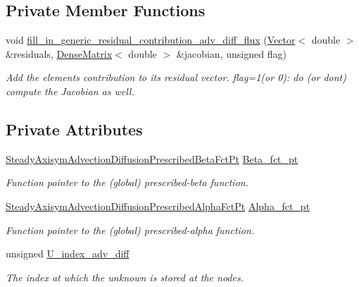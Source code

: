 \subsection*{Private Member Functions}
\begin{DoxyCompactItemize}
\item 
void \hyperlink{classoomph_1_1SteadyAxisymAdvectionDiffusionFluxElement_ab9bb9d085a2f05045a0c78cc7210a25f}{fill\+\_\+in\+\_\+generic\+\_\+residual\+\_\+contribution\+\_\+adv\+\_\+diff\+\_\+flux} (\hyperlink{classoomph_1_1Vector}{Vector}$<$ double $>$ \&residuals, \hyperlink{classoomph_1_1DenseMatrix}{Dense\+Matrix}$<$ double $>$ \&jacobian, unsigned flag)
\begin{DoxyCompactList}\small\item\em Add the element\textquotesingle{}s contribution to its residual vector. flag=1(or 0)\+: do (or don\textquotesingle{}t) compute the Jacobian as well. \end{DoxyCompactList}\end{DoxyCompactItemize}
\subsection*{Private Attributes}
\begin{DoxyCompactItemize}
\item 
\hyperlink{classoomph_1_1SteadyAxisymAdvectionDiffusionFluxElement_acaec4345326b85f4689043efd2cd1e1c}{Steady\+Axisym\+Advection\+Diffusion\+Prescribed\+Beta\+Fct\+Pt} \hyperlink{classoomph_1_1SteadyAxisymAdvectionDiffusionFluxElement_abdcfdeebbd0696dcc41089f644cc2ffa}{Beta\+\_\+fct\+\_\+pt}
\begin{DoxyCompactList}\small\item\em Function pointer to the (global) prescribed-\/beta function. \end{DoxyCompactList}\item 
\hyperlink{classoomph_1_1SteadyAxisymAdvectionDiffusionFluxElement_a28cea997740e6174b3e3583d704229ce}{Steady\+Axisym\+Advection\+Diffusion\+Prescribed\+Alpha\+Fct\+Pt} \hyperlink{classoomph_1_1SteadyAxisymAdvectionDiffusionFluxElement_a6ecd9c041f8fcecc01dd59c4857d4d5b}{Alpha\+\_\+fct\+\_\+pt}
\begin{DoxyCompactList}\small\item\em Function pointer to the (global) prescribed-\/alpha function. \end{DoxyCompactList}\item 
unsigned \hyperlink{classoomph_1_1SteadyAxisymAdvectionDiffusionFluxElement_a2291a510aed77d9512d5f6660418b025}{U\+\_\+index\+\_\+adv\+\_\+diff}
\begin{DoxyCompactList}\small\item\em The index at which the unknown is stored at the nodes. \end{DoxyCompactList}\end{DoxyCompactItemize}
